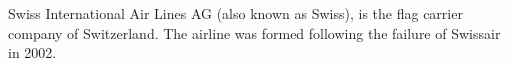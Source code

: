Swiss International Air Lines AG (also known as Swiss), is the flag carrier company of Switzerland.
The airline was formed following the failure of Swissair in 2002.